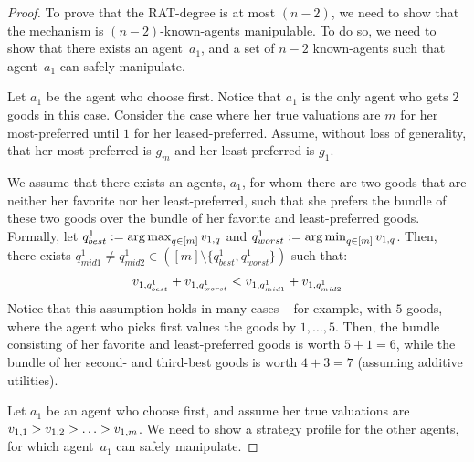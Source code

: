 \begin{proof}
    To prove that the RAT-degree is at most $(n-2)$, we need to show that the mechanism is $(n-2)$-known-agents manipulable.
    To do so, we need to show that there exists an agent~$a_1$, and a set of $n-2$ known-agents such that agent~$a_1$ can safely manipulate. 

    Let $a_1$ be the agent who choose first. Notice that $a_1$ is the only agent who gets $2$ goods in this case. 
    Consider the case where her true valuations are $m$ for her most-preferred until $1$ for her leased-preferred. 
    Assume, without loss of generality, that her most-preferred is $g_m$ and her least-preferred is $g_1$.

    
    
    We assume that there exists an agents, $a_1$, for whom there are two goods that are neither her favorite nor her least-preferred, such that she prefers the bundle of these two goods over the bundle of her favorite and least-preferred goods.
    Formally, let $q^1_{best} := \operatorname*{arg\,max}_{q\in [m]} v_{1,q}$ and $q^1_{worst} := \operatorname*{arg\,min}_{q\in [m]} v_{1,q}$. Then, there exists $q^1_{mid1} \neq q^1_{mid2} \in ([m] \setminus \{q^1_{best}, q^1_{worst}\})$ such that:
    \begin{align*}
        v_{1,q^1_{best}} + v_{1,q^1_{worst}} < v_{1,q^1_{mid1}} + v_{1,q^1_{mid2}}
    \end{align*}
    Notice that this assumption holds in many cases -- for example, with 
    $5$ goods, where the agent who picks first values the goods by $1, \ldots, 5$. Then, the bundle consisting of her favorite and least-preferred goods is worth $5+1 =6$, while the bundle of her second- and third-best goods is worth $4+3=7$ (assuming additive utilities).



    
    
    

    

    Let $a_1$ be an agent who choose first, and assume her true valuations are $v_{1,1} > v_{1,2} > \ldots > v_{1,m}$.
    We need to show a strategy profile for the other agents, for which agent~$a_1$ can safely manipulate. 


\end{proof}
